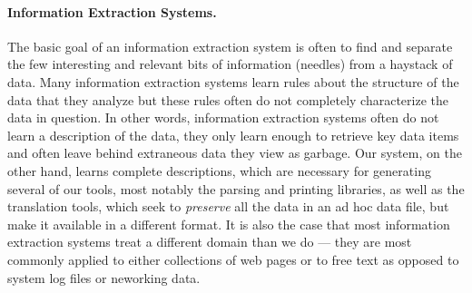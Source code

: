 

\paragraph*{Information Extraction Systems.}

The basic goal of an information extraction system is often
to find and separate the few interesting and relevant bits of information 
(needles) from a haystack of data.  Many information extraction
systems learn rules about the structure of the data that they
analyze but these rules often do not completely characterize
the data in question.  In other words, information extraction systems
often do not learn a description of the data, they only learn enough
to retrieve key data items and often leave behind extraneous data they
view as garbage.  Our system, on the other hand, learns complete descriptions,
which are necessary for generating several of our tools,
most notably the parsing and printing libraries, as well as the translation
tools, which seek to {\em preserve} all the data in an ad hoc data file,
but make it available in a different format.  It is also the case that
most information extraction systems treat a different domain than we do ---
they are most commonly applied to either collections of web pages or to 
free text as opposed to system log files or neworking data.

